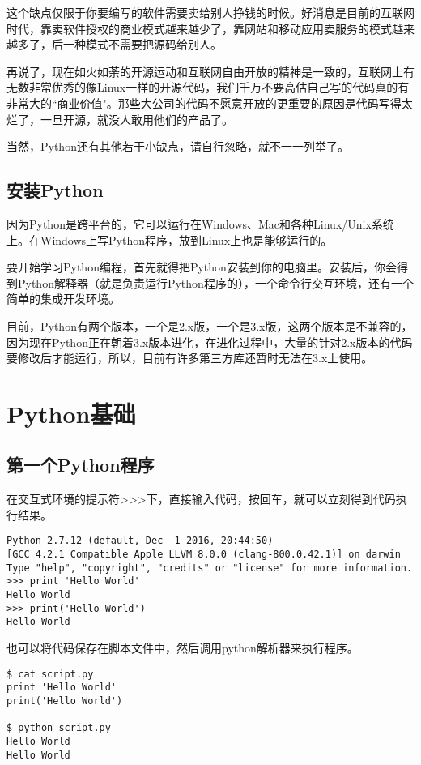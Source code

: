 这个缺点仅限于你要编写的软件需要卖给别人挣钱的时候。好消息是目前的互联网时代，靠卖软件授权的商业模式越来越少了，靠网站和移动应用卖服务的模式越来越多了，后一种模式不需要把源码给别人。

再说了，现在如火如荼的开源运动和互联网自由开放的精神是一致的，互联网上有无数非常优秀的像Linux一样的开源代码，我们千万不要高估自己写的代码真的有非常大的``商业价值"。那些大公司的代码不愿意开放的更重要的原因是代码写得太烂了，一旦开源，就没人敢用他们的产品了。

当然，Python还有其他若干小缺点，请自行忽略，就不一一列举了。

\subsection{安装Python}
因为Python是跨平台的，它可以运行在Windows、Mac和各种Linux/Unix系统上。在Windows上写Python程序，放到Linux上也是能够运行的。

要开始学习Python编程，首先就得把Python安装到你的电脑里。安装后，你会得到Python解释器（就是负责运行Python程序的），一个命令行交互环境，还有一个简单的集成开发环境。

目前，Python有两个版本，一个是2.x版，一个是3.x版，这两个版本是不兼容的，因为现在Python正在朝着3.x版本进化，在进化过程中，大量的针对2.x版本的代码要修改后才能运行，所以，目前有许多第三方库还暂时无法在3.x上使用。

\section{Python基础}
\subsection{第一个Python程序}
在交互式环境的提示符>>>下，直接输入代码，按回车，就可以立刻得到代码执行结果。
\begin{verbatim}
Python 2.7.12 (default, Dec  1 2016, 20:44:50) 
[GCC 4.2.1 Compatible Apple LLVM 8.0.0 (clang-800.0.42.1)] on darwin
Type "help", "copyright", "credits" or "license" for more information.
>>> print 'Hello World'
Hello World
>>> print('Hello World')
Hello World
\end{verbatim}

也可以将代码保存在脚本文件中，然后调用python解析器来执行程序。
\begin{verbatim}
$ cat script.py
print 'Hello World'
print('Hello World')

$ python script.py
Hello World
Hello World
\end{verbatim}

